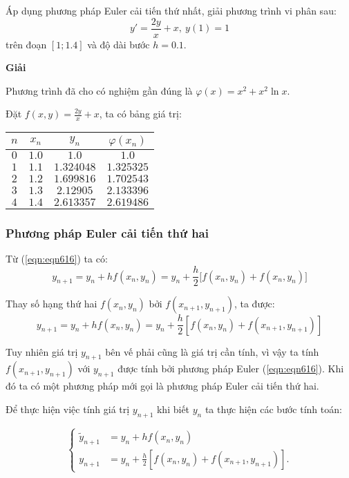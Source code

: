 \begin{example}
	Áp dụng phương pháp Euler cải tiến thứ nhất, giải phương trình vi phân sau:
	\begin{equation}
		y'=\frac{2y}{x}+x,~y(1)=1
	\end{equation}
	trên đoạn $\left[1;1.4\right]$ và độ dài bước $h=0.1$.\par
\end{example}

\textbf{Giải}\par
Phương trình đã cho có nghiệm gần đúng là $\varphi(x)=x^2+x^2\ln x$.\par
Đặt $f(x,y)=\frac{2y}{x}+x$, ta có bảng giá trị:
\begin{center}\begin{tabular}{|c|c|c|c|}\hline
	$n$ & $x_n$ & $y_n$      & $\varphi(x_n)$\\\hline
	$0$ & $1.0$ & $1.0$      & $1.0$      \\\hline
	$1$ & $1.1$ & $1.324048$ & $1.325325$ \\\hline
	$2$ & $1.2$ & $1.699816$ & $1.702543$ \\\hline
	$3$ & $1.3$ & $2.12905$  & $2.133396$ \\\hline
	$4$ & $1.4$ & $2.613357$ & $2.619486$ \\\hline
\end{tabular}\end{center}

\subsubsection{Phương pháp Euler cải tiến thứ hai}

Từ (\ref{eqn:eqn616}) ta có:
$$y_{n+1}=y_n+hf(x_n,y_n)=y_n+\frac h2\big[f(x_n,y_n)+f(x_n,y_n )\big]$$

Thay số hạng thứ hai $f(x_n,y_n)$ bởi $f(x_{n+1},y_{n+1})$, ta được:
$$y_{n+1}=y_n+hf(x_n,y_n)=y_n+\frac h2\left[ f(x_n,y_n)+f(x_{n+1},y_{n+1}) \right]$$

Tuy nhiên giá trị $y_{n+1}$ bên vế phải cũng là giá trị cần tính, vì vậy ta tính $f(x_{n+1},y_{n+1})$ với $y_{n+1}$ được tính bởi phương pháp Euler (\ref{eqn:eqn616}). Khi đó ta có một phương pháp mới gọi là phương pháp Euler cải tiến thứ hai.\par
Để thực hiện việc tính giá trị $y_{n+1}$  khi biết $y_n$  ta thực hiện các bước tính toán:\par

\begin{equation}\label{eqn:eqn619}\begin{cases}
	\tilde{y}_{n+1}&=y_n+hf(x_n,y_n)\\
	 y_{n+1}&=y_n+\frac h2\left[ f(x_n,y_n)+f(x_{n+1},y_{n+1}) \right].
\end{cases}\end{equation}

